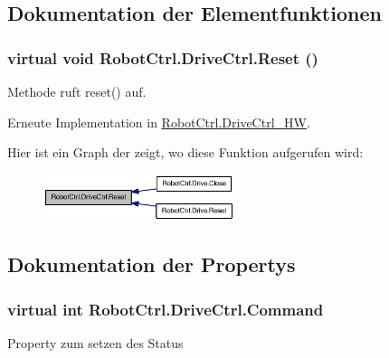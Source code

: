 \subsection{Dokumentation der Elementfunktionen}
\hypertarget{class_robot_ctrl_1_1_drive_ctrl_a721795047bfe5d2cca3fab6eeb0ab905}{
\subsubsection[{Reset}]{\setlength{\rightskip}{0pt plus 5cm}virtual void RobotCtrl.DriveCtrl.Reset ()}}
\label{class_robot_ctrl_1_1_drive_ctrl_a721795047bfe5d2cca3fab6eeb0ab905}
Methode ruft reset() auf. 

Erneute Implementation in \hyperlink{class_robot_ctrl_1_1_drive_ctrl___h_w_a30785a704b5385ea9c41ad87ebb8f61f}{RobotCtrl.DriveCtrl\_\-HW}.



Hier ist ein Graph der zeigt, wo diese Funktion aufgerufen wird:\nopagebreak
\begin{figure}[H]
\begin{center}
\leavevmode
\includegraphics[width=158pt]{class_robot_ctrl_1_1_drive_ctrl_a721795047bfe5d2cca3fab6eeb0ab905_icgraph}
\end{center}
\end{figure}




\subsection{Dokumentation der Propertys}
\hypertarget{class_robot_ctrl_1_1_drive_ctrl_a45359565bdcb6293ed723acb48cae18b}{
\subsubsection[{Command}]{\setlength{\rightskip}{0pt plus 5cm}virtual int RobotCtrl.DriveCtrl.Command}}
\label{class_robot_ctrl_1_1_drive_ctrl_a45359565bdcb6293ed723acb48cae18b}
Property zum setzen des Status 


